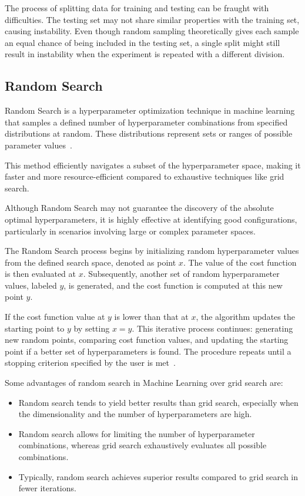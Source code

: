 \documentclass[12pt,a4paper]{report}
\begin{document}
The process of splitting data for training and testing can be fraught with difficulties. The testing set may not share similar properties with the training set, causing instability. Even though random sampling theoretically gives each sample an equal chance of being included in the testing set, a single split might still result in instability when the experiment is repeated with a different division.


\subsection{Random Search}
Random Search is a hyperparameter optimization technique in machine learning that samples a defined number of hyperparameter combinations from specified distributions at random. These distributions represent sets or ranges of possible parameter values~\cite{randomsearch}.

This method efficiently navigates a subset of the hyperparameter space, making it faster and more resource-efficient compared to exhaustive techniques like grid search.

Although Random Search may not guarantee the discovery of the absolute optimal hyperparameters, it is highly effective at identifying good configurations, particularly in scenarios involving large or complex parameter spaces.

The Random Search process begins by initializing random hyperparameter values from the defined search space, denoted as point \(x\). The value of the cost function is then evaluated at \(x\). Subsequently, another set of random hyperparameter values, labeled \(y\), is generated, and the cost function is computed at this new point \(y\).

If the cost function value at \(y\) is lower than that at \(x\), the algorithm updates the starting point to \(y\) by setting \(x = y\). This iterative process continues: generating new random points, comparing cost function values, and updating the starting point if a better set of hyperparameters is found. The procedure repeats until a stopping criterion specified by the user is met~\cite{randomsearch2}.

Some advantages of random search in Machine Learning over grid search are:

\begin{itemize}
  \item Random search tends to yield better results than grid search, especially when the dimensionality and the number of hyperparameters are high.
  \item Random search allows for limiting the number of hyperparameter combinations, whereas grid search exhaustively evaluates all possible combinations.
  \item Typically, random search achieves superior results compared to grid search in fewer iterations.
\end{itemize}
\end{document}
